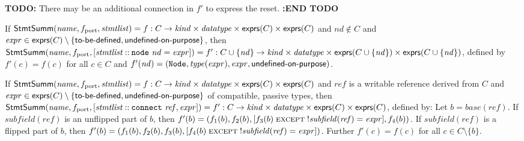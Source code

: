 \documentclass[a4paper]{article}
\newcommand{\stmtsem}{\mathsf{StmtSumm}}
\newcommand{\expressions}{\mathsf{exprs}}
\newcommand{\rconslist}[2]{[#1 \mathbin{::} #2]}
\newcommand{\needtobedefined}{\text{\textsf{to-be-defined}}}
\newcommand{\undefinedonpurpose}{\text{\textsf{undefined-on-purpose}}}
\begin{document}
\begin{description}
	\textbf{TODO:} There may be an additional connection in $f'$ to express the reset. \textbf{:END TODO}

\item[Node definition:]
	If $\stmtsem(\mathit{name}, \linebreak[0] f_\mathrm{port}, \linebreak[0] \mathit{stmtlist}) = f: C \to \mathit{kind} \times \mathit{datatype} \times \expressions(C) \times \expressions(C)$
	and $\mathit{nd} \notin C$ and $\mathit{expr} \in \expressions(C) \setminus \{ \needtobedefined, \linebreak[0] \undefinedonpurpose \}$,
	then $\stmtsem(\mathit{name}, \linebreak[0] f_\mathrm{port}, \linebreak[0] \rconslist{\mathit{stmtlist}}{\linebreak[0] \mathtt{node~} \mathit{nd} = \mathit{expr}}) = f': C \cup \{ \mathit{nd} \} \to \mathit{kind} \times \mathit{datatype} \times \expressions(C \cup \{ \mathit{nd} \}) \times \expressions(C \cup \{ \mathit{nd} \})$,
	defined by $f'(c) = f(c)$ for all $c \in C$ and $f'(\mathit{nd}) = (\mathtt{Node}, \mathit{type}(\mathit{expr}), \linebreak[0] \mathit{expr}, \linebreak[0] \undefinedonpurpose)$.

\item[Unidirectional connect statement:]
	If $\stmtsem(\mathit{name}, \linebreak[0] f_\mathrm{port}, \linebreak[0] \mathit{stmtlist}) = f: C \to \mathit{kind} \times \mathit{datatype} \times \expressions(C) \times \expressions(C)$
	and $\mathit{ref}$ is a writable reference derived from $C$ and $\mathit{expr} \in \expressions(C) \setminus \{ \needtobedefined, \linebreak[0] \undefinedonpurpose \}$ of compatible, passive types,
	then $\stmtsem(\mathit{name}, \linebreak[0] f_\mathrm{port}, \linebreak[0] \rconslist{\mathit{stmtlist}}{\linebreak[0] \mathtt{connect~} \mathit{ref}, \linebreak[0] \mathit{expr}}) = f': C \to \mathit{kind} \times \mathit{datatype} \times \expressions(C) \times \expressions(C)$,
	defined by:
	Let $b = \mathit{base}(\mathit{ref})$.
	If $\mathit{subfield}(\mathit{ref})$ is an unflipped part of $b$, then $f'(b) = (f_1(b), \linebreak[0] f_2(b), \linebreak[0] [f_3(b) \mathrel{\textsc{except}} \mathord{!}\mathit{subfield}(\mathit{ref}) = \mathit{expr}], f_4(b))$.
	If $\mathit{subfield}(\mathit{ref})$ is a    flipped part of $b$, then $f'(b) = (f_1(b), \linebreak[0] f_2(b), \linebreak[0] f_3(b), \linebreak[0] [f_4(b) \mathrel{\textsc{except}} \mathord{!}\mathit{subfield}(\mathit{ref}) = \mathit{expr}])$.
	Further $f'(c) = f(c)$ for all $c \in C \setminus \{ b \}$.


\end{description}
\end{document}
